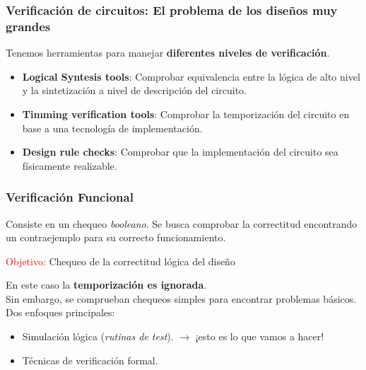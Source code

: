 \documentclass[aspectratio=169]{beamer}
\begin{document}
\begin{frame}[fragile,t]
    \frametitle{Verificación de circuitos: El problema de los diseños muy grandes}
    Tenemos herramientas para manejar \textbf{diferentes niveles de verificación}.\\
    \begin{itemize}
    \item<2-> \textcolor{naranjauca}{\textbf{Logical Syntesis tools}}: Comprobar equivalencia entre la lógica de alto nivel y la sintetización a nivel de descripción del circuito.
    \item<3-> \textcolor{naranjauca}{\textbf{Timming verification tools}}: Comprobar la temporización del circuito en base a una tecnología de implementación.  
    \item<4-> \textcolor{naranjauca}{\textbf{Design rule checks}}: Comprobar que la implementación del circuito sea físicamente realizable.
    \end{itemize}
    \bigskip
\end{frame}

\begin{frame}[fragile,t]
    \frametitle{Verificación Funcional }
    Consiste en un chequeo \emph{booleano}. Se busca comprobar la correctitud encontrando un contraejemplo para su correcto funcionamiento.\\
    \bigskip
    \begin{center}
    {\Large \textcolor{red}{Objetivo:} Chequeo de la correctitud lógica del diseño}
    \end{center}
    \bigskip
    \pause
    En este caso la \textbf{temporización es ignorada}.\\
    \textcolor{verdeuca}{Sin embargo, se comprueban chequeos simples para encontrar problemas básicos.}\\
    \bigskip
    \pause
    Dos enfoques principales:
    \begin{itemize}
    \item Simulación lógica (\textit{rutinas de test}). $\rightarrow$ \textcolor{naranjauca}{¡esto es lo que vamos a hacer!}
    \item Técnicas de verificación formal.
    \end{itemize}
\end{frame}
\end{document}
